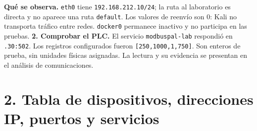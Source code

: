 \documentclass[11pt,a4paper]{article}
\begin{document}
\textbf{Qué se observa.} \texttt{eth0} tiene \texttt{192.168.212.10/24}; la ruta al laboratorio es directa y no aparece una ruta \texttt{default}. Los valores de reenvío son 0: Kali no transporta tráfico entre redes. \texttt{docker0} permanece inactivo y no participa en las pruebas.
\textbf{2. Comprobar el PLC.} El servicio \texttt{modbuspal-lab} respondió en \texttt{.30:502}. Los registros configurados fueron \texttt{[250,1000,1,750]}. Son enteros de prueba, sin unidades físicas asignadas. La lectura y su evidencia se presentan en el análisis de comunicaciones.

\clearpage\section*{2. Tabla de dispositivos, direcciones IP, puertos y servicios}\label{tabla}
\end{document}
